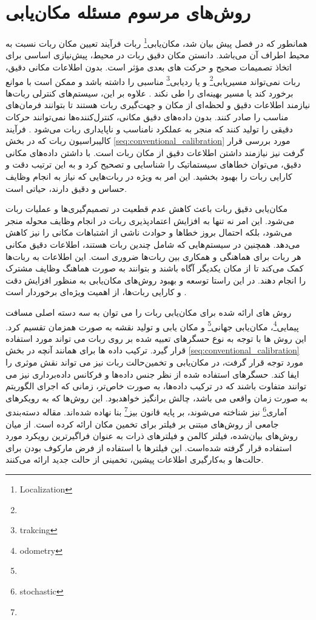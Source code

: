 \section{روش‌های مرسوم مسئله مکان‌یابی}
همانطور که در فصل پیش بیان شد، مکان‌یابی\footnote{Localization}
 ربات فرآیند تعیین مکان ربات نسبت به محیط اطراف آن می‌باشد. دانستن مکان دقیق ربات در محیط، پیش‌نیازی اساسی برای اتخاذ تصمیمات صحیح و حرکت های بعدی مؤثر است. بدون اطلاعات مکانی دقیق، ربات نمی‌تواند مسیریابی\footnote{}
  و یا ردیابی\footnote{trakcing}
مناسبی را داشته باشد و ممکن است با موانع برخورد کند یا مسیر بهینه‌ای را طی نکند
\cite{ahmad2013cooperative}.
 علاوه بر این، سیستم‌های کنترلی ربات‌ها نیازمند اطلاعات دقیق و لحظه‌ای از مکان و جهت‌گیری ربات هستند تا بتوانند فرمان‌های مناسب را صادر کنند. بدون داده‌های دقیق مکانی، کنترل‌کننده‌ها نمی‌توانند حرکات دقیقی را تولید کنند که منجر به عملکرد نامناسب و ناپایداری ربات می‌شود
\cite{guibas1997robot}.
فرآیند کالیبراسیون ربات که در بخش 
\ref{seq:conventional_calibration}
مورد بررسی قرار گرفت نیز نیازمند داشتن اطلاعات دقیق از مکان ربات است. با داشتن داده‌های مکانی دقیق، می‌توان خطاهای سیستماتیک را شناسایی و تصحیح کرد و به این ترتیب دقت و کارایی ربات را بهبود بخشید. این امر به ویژه در ربات‌هایی که نیاز به انجام وظایف حساس و دقیق دارند، حیاتی است. 

مکان‌یابی دقیق ربات باعث کاهش عدم قطعیت در تصمیم‌گیری‌ها و عملیات ربات می‌شود. این امر نه تنها به افزایش اعتمادپذیری ربات در انجام وظایف محوله منجر می‌شود، بلکه احتمال بروز خطاها و حوادث ناشی از اشتباهات مکانی را نیز کاهش می‌دهد. همچنین در سیستم‌هایی که شامل چندین ربات هستند، اطلاعات دقیق مکانی هر ربات برای هماهنگی و همکاری بین ربات‌ها ضروری است. این اطلاعات به ربات‌ها کمک می‌کند تا از مکان یکدیگر آگاه باشند و بتوانند به صورت هماهنگ وظایف مشترک را انجام دهند. در این راستا توسعه و بهبود روش‌های مکان‌یابی به منظور افزایش دقت و کارایی ربات‌ها، از اهمیت ویژه‌ای برخوردار است
\cite{aragues2011multi}.


روش های ارائه شده برای مکان‌یابی ربات را می توان به سه دسته اصلی مسافت پیمایی\footnote{odometry}،
مکان‌یابی جهانی\footnote{}
و مکان یابی و تولید نقشه به صورت همزمان تقسیم کرد. این روش ها با توجه به نوع حسگرهای تعبیه شده بر روی ربات می تواند مورد استفاده قرار گیرد. ترکیب داده ها برای همانند آنچه در بخش
\ref{seq:conventional_calibration}
مورد توجه قرار گرفت، در مکان‌یابی و تخمین‌حالت ربات نیز می تواند نقش موثری را ایفا کند. حسگر‌های استفاده شده از نظر جنس داده‌ها و فرکانس داده‌برداری نیز می توانند متفاوت باشند که در ترکیب داده‌ها، به صورت خاص‌تر، زمانی که اجرای الگوریتم به صورت زمان واقعی می باشد، چالش برانگیز خواهد‌بود. این روش‌ها که به رویکرهای آماری\footnote{stochastic}
نیز شناخته می‌شوند، بر پایه قانون بیز\footnote{}
بنا نهاده شده‌اند.  مقاله
\cite{panigrahi2022localization} 
دسته‌بندی جامعی از روش‌های مبتنی بر فیلتر برای تخمین مکان ارائه کرده است. از میان روش‌های بیان‌شده، فیلتر کالمن و فیلترهای ذرات به عنوان فراگیرترین رویکرد مورد استفاده قرار گرفته شده‌است. این فیلترها با استفاده از فرض مارکوف بودن برای حالت‌ها و به‌کار‌گیری اطلاعات پیشین، تخمینی از حالت جدید ارائه می‌کنند. 

